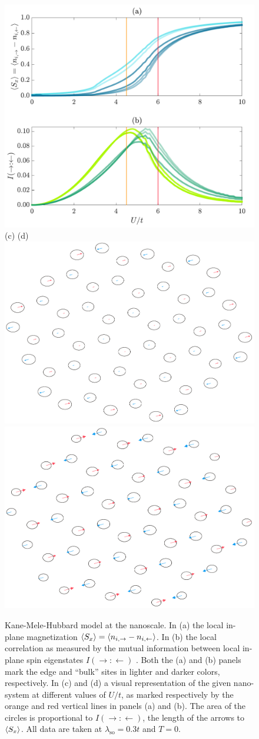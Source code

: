 \documentclass[edipack_sp.tex]{subfiles}
\begin{document}
\begin{figure}
    \centering
    \includegraphics[width=0.8\linewidth]{figures/flakes_edipack.pdf}\\[1mm]
    (c) \hspace{10cm} (d) \\
    \hspace{1.2cm}
    \includegraphics[width=0.33\linewidth]{figures/3NflakeU4.5_x.pdf} \hspace{1.2cm}
    \includegraphics[width=0.33\linewidth]{figures/3NflakeU6_x.pdf} \vspace{3mm}
    \caption{Kane-Mele-Hubbard model at the nanoscale.
    In (a) the local in-plane
    magnetization $\langle S_x \rangle = \langle n_{i,\rightarrow}-n_{i,\leftarrow}\rangle$. In
    (b) the local correlation as measured by the mutual 
    information between local in-plane spin eigenstates
    $I(\rightarrow:\leftarrow)$ \cite{BellomiaPhD,BellomiaKMH,Bellomia_intracorr}. 
    Both the (a) and (b) panels mark the edge and ``bulk'' 
    sites in lighter and darker colors, respectively.
    In (c) and (d) a visual representation of the given 
    nano-system at different values of $U/t$, as marked 
    respectively by the orange and red vertical lines 
    in panels (a) and (b). The area of the 
    circles is proportional to $I(\rightarrow:\leftarrow)$, 
    the length of the arrows to $\langle S_x \rangle$.
    All data are taken at $\lambda_\mathrm{so}=0.3t$ and $T=0$.}
    \label{fig:KMflake}
\end{figure}
\end{document}
